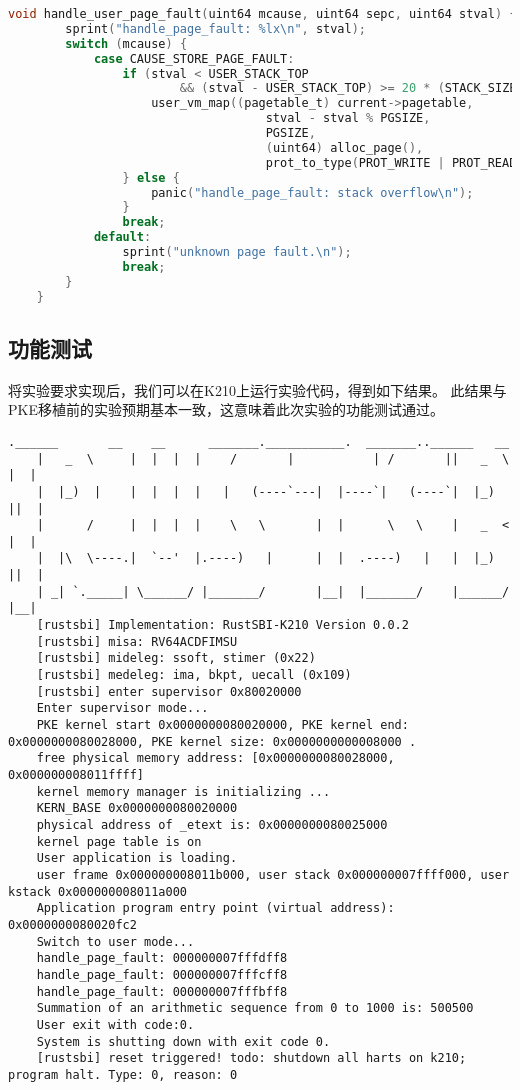 \begin{lstlisting}[caption={handle\_page\_fault}, label={lst:handle_page_fault}, language=C]
    void handle_user_page_fault(uint64 mcause, uint64 sepc, uint64 stval) {
        sprint("handle_page_fault: %lx\n", stval);
        switch (mcause) {
            case CAUSE_STORE_PAGE_FAULT:
                if (stval < USER_STACK_TOP 
                        && (stval - USER_STACK_TOP) >= 20 * (STACK_SIZE)) {
                    user_vm_map((pagetable_t) current->pagetable,
                                    stval - stval % PGSIZE, 
                                    PGSIZE, 
                                    (uint64) alloc_page(),
                                    prot_to_type(PROT_WRITE | PROT_READ, 1));
                } else {
                    panic("handle_page_fault: stack overflow\n");
                }
                break;
            default:
                sprint("unknown page fault.\n");
                break;
        }
    }    
\end{lstlisting}

\subsection{功能测试}

将实验要求实现后，我们可以在K210上运行实验代码，得到如下结果。
此结果与PKE移植前的实验预期基本一致，这意味着此次实验的功能测试通过。

\begin{lstlisting}[caption={lab6实验结果（移植K210后）}]
    .______       __    __      _______.___________.  _______..______   __
    |   _  \     |  |  |  |    /       |           | /       ||   _  \ |  |
    |  |_)  |    |  |  |  |   |   (----`---|  |----`|   (----`|  |_)  ||  |
    |      /     |  |  |  |    \   \       |  |      \   \    |   _  < |  |
    |  |\  \----.|  `--'  |.----)   |      |  |  .----)   |   |  |_)  ||  |
    | _| `._____| \______/ |_______/       |__|  |_______/    |______/ |__|
    [rustsbi] Implementation: RustSBI-K210 Version 0.0.2
    [rustsbi] misa: RV64ACDFIMSU
    [rustsbi] mideleg: ssoft, stimer (0x22)
    [rustsbi] medeleg: ima, bkpt, uecall (0x109)
    [rustsbi] enter supervisor 0x80020000
    Enter supervisor mode...
    PKE kernel start 0x0000000080020000, PKE kernel end: 0x0000000080028000, PKE kernel size: 0x0000000000008000 .
    free physical memory address: [0x0000000080028000, 0x000000008011ffff]
    kernel memory manager is initializing ...
    KERN_BASE 0x0000000080020000
    physical address of _etext is: 0x0000000080025000
    kernel page table is on
    User application is loading.
    user frame 0x000000008011b000, user stack 0x000000007ffff000, user kstack 0x000000008011a000
    Application program entry point (virtual address): 0x0000000080020fc2
    Switch to user mode...
    handle_page_fault: 000000007fffdff8
    handle_page_fault: 000000007fffcff8
    handle_page_fault: 000000007fffbff8
    Summation of an arithmetic sequence from 0 to 1000 is: 500500
    User exit with code:0.
    System is shutting down with exit code 0.
    [rustsbi] reset triggered! todo: shutdown all harts on k210; program halt. Type: 0, reason: 0    
\end{lstlisting}

